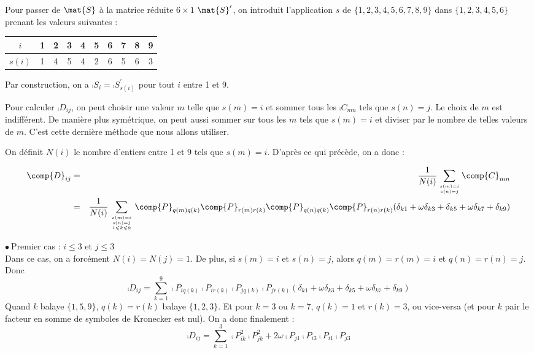 Pour passer de $\mat{S}$ \`a la matrice r\'eduite $6\times 1$ $\mat{S}^\prime$,
on introduit l'application $s$ de $\{1,2,3,4,5,6,7,8,9\}$ dans
$\{1,2,3,4,5,6\}$ prenant les valeurs suivantes :
\begin{center}
\begin{tabular}{|c|c|c|c|c|c|c|c|c|c|}
\hline
$i$&1&2&3&4&5&6&7&8&9\\
\hline
$s(i)$&1&4&5&4&2&6&5&6&3\\
\hline
\end{tabular}
\end{center}
Par construction, on a $\comp{S}_i=\comp{S}^\prime_{s(i)}$ pour tout $i$ entre 1
et 9.

Pour calculer $\comp{D}_{ij}$, on peut choisir une valeur $m$ telle que
$s(m)=i$ et sommer tous les $\comp{C}_{mn}$ tels que $s(n)=j$. Le choix de $m$
est indiff\'erent. De mani\`ere plus sym\'etrique, on peut aussi sommer sur tous
les $m$ tels que $s(m)=i$ et diviser par le nombre de telles valeurs de $m$. C'est
cette derni\`ere m\'ethode que nous allons utiliser.

On d\'efinit $N(i)$ le nombre d'entiers entre 1 et 9 tels que
$s(m)=i$. D'apr\`es ce qui pr\'ec\`ede, on a donc :

\begin{eqnarray}
\comp{D}_{ij}&=&\frac{1}{N(i)}\sum_{s(m)=i \atop s(n)=j}\comp{C}_{mn}\nonumber\\
&=&\frac{1}{N(i)}\sum_{{s(m)=i \atop s(n)=j}\atop 1\leqslant k\leqslant 9}
\comp{P}_{q(m)q(k)}\comp{P}_{r(m)r(k)}\comp{P}_{q(n)q(k)}\comp{P}_{r(n)r(k)}
(\delta_{k1}+\omega\delta_{k3}+\delta_{k5}+\omega\delta_{k7}+\delta_{k9})
\end{eqnarray}

\vspace{1cm}
$\bullet\ ${\sc Premier cas} : $i\leqslant 3$ et $j\leqslant 3$\\
Dans ce cas, on a forc\'ement $N(i)=N(j)=1$. De plus, si $s(m)=i$ et $s(n)=j$,
alors $q(m)=r(m)=i$ et $q(n)=r(n)=j$. Donc \\
\begin{equation}
\comp{D}_{ij}=\sum_{k=1}^9
\comp{P}_{iq(k)}\comp{P}_{ir(k)}\comp{P}_{jq(k)}\comp{P}_{jr(k)}
(\delta_{k1}+\omega\delta_{k3}+\delta_{k5}+\omega\delta_{k7}+\delta_{k9})
\end{equation}
Quand $k$ balaye $\{1,5,9\}$, $q(k)=r(k)$ balaye $\{1,2,3\}$. Et pour $k=3$ ou
$k=7$, $q(k)=1$ et $r(k)=3$, ou vice-versa (et pour $k$ pair le facteur en somme
de symboles de Kronecker est nul). On a donc finalement :
\begin{equation}
\comp{D}_{ij}=\sum_{k=1}^3\comp{P}_{ik}^2\comp{P}_{jk}^2
+2\omega\comp{P}_{j1}\comp{P}_{i3}\comp{P}_{i1}\comp{P}_{j3}
\end{equation}

